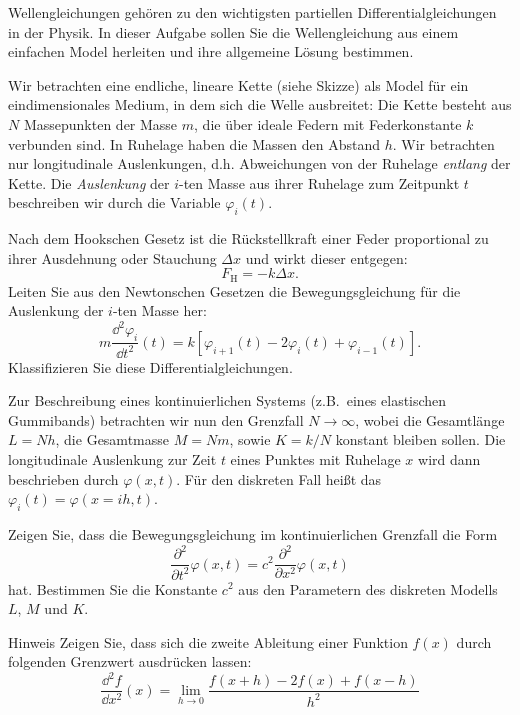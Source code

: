 \documentclass{scrartcl}
\begin{document}
Wellengleichungen gehören zu den wichtigsten partiellen Differentialgleichungen in der Physik.
In dieser Aufgabe sollen Sie die Wellengleichung aus einem einfachen Model herleiten und ihre allgemeine Lösung bestimmen.

\begin{subex}
  \item{} Wir betrachten eine endliche, lineare Kette (siehe Skizze) als Model für ein eindimensionales Medium, in dem sich die Welle ausbreitet:
  Die Kette besteht aus $N$ Massepunkten der Masse $m$, die über ideale Federn mit Federkonstante $k$ verbunden sind.
  In Ruhelage haben die Massen den Abstand $h$.
  Wir betrachten nur longitudinale Auslenkungen, d.h. Abweichungen von der Ruhelage \emph{entlang} der Kette.
  Die \emph{Auslenkung} der $i$-ten Masse aus ihrer Ruhelage zum Zeitpunkt $t$ beschreiben wir durch die Variable $\varphi_i(t)$.

  Nach dem Hookschen Gesetz ist die Rückstellkraft einer Feder proportional zu ihrer Ausdehnung oder Stauchung $\Delta x$ und wirkt dieser entgegen:
  \[
    F_{\mathrm{H}} = -k \Delta x.
  \]
  Leiten Sie aus den Newtonschen Gesetzen die Bewegungsgleichung für die Auslenkung der $i$-ten Masse her:
  \[
    m \frac{\dd^2 \varphi_i}{\dd t^2} (t) = k \left[ \varphi_{i+1}(t) - 2 \varphi_i(t) + \varphi_{i-1}(t) \right].
  \]
  Klassifizieren Sie diese Differentialgleichungen.


  \item{} Zur Beschreibung eines kontinuierlichen Systems (z.B.\ eines elastischen Gummibands) betrachten wir nun den Grenzfall $N \to \infty$, wobei die Gesamtlänge $L = Nh$, die Gesamtmasse $M = Nm$, sowie $K = k/N$ konstant bleiben sollen.
  Die longitudinale Auslenkung zur Zeit $t$ eines Punktes mit Ruhelage $x$ wird dann beschrieben durch $\varphi(x, t)$.
  Für den diskreten Fall heißt das $\varphi_i(t) = \varphi(x=i h, t)$.

  Zeigen Sie, dass die Bewegungsgleichung im kontinuierlichen Grenzfall die Form
  \[
    \frac{\partial^2}{\partial t^2} \varphi(x, t) = c^2 \frac{\partial^2}{\partial x^2} \varphi(x, t)
    \label{eq:eom}
  \]
  hat.
  Bestimmen Sie die Konstante $c^2$ aus den Parametern des diskreten Modells $L$, $M$ und $K$.
  \begin{remark}{Hinweis}
    Zeigen Sie, dass sich die zweite Ableitung einer Funktion $f(x)$ durch folgenden Grenzwert ausdrücken lassen:
    \[
      \frac{\dd^2 f}{\dd x^2}(x) = \lim_{h \to 0} \frac{f(x + h) - 2f(x) + f(x - h)}{h^2}
    \] 
    

\end{remark}
\end{subex}
\end{document}
